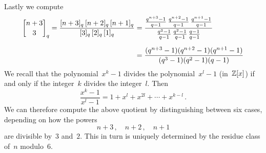 \documentclass[a4paper, 11pt, twoside=semi]{scrartcl}
\begin{document}
Lastly we compute
\begin{align*}
  \qbinom{n+3}{3}_q
  =
  \frac{ \qnum{n+3}_q \, \qnum{n+2}_q \, \qnum{n+1}_q }{ \qnum{3}_q \, \qnum{2}_q \, \qnum{1}_q }
  &=
  \frac{
    \frac{q^{n+3} - 1}{q - 1} \, \frac{q^{n+2} - 1}{q - 1} \, \frac{q^{n+1} - 1}{q - 1}
  }{
    \frac{q^3 - 1}{q - 1} \, \frac{q^2 - 1}{q - 1} \, \frac{q - 1}{q - 1}
  }
  \\[0.6em]
  &=
  \frac{ (q^{n+3} - 1) (q^{n+2} - 1) (q^{n+1} - 1) }{ (q^3 - 1) (q^2 - 1) (q - 1) }
\end{align*}
We recall that the polynomial~$x^k - 1$ divides the polynomial~$x^l - 1$ (in~$\mathbb{Z}[x]$) if and only if the integer~$k$ divides the integer~$l$.
Then
\[
  \frac{x^k - 1}{x^l - 1}
  =
  1 + x^l + x^{2l} + \dotsb + x^{k-l} \,.
\]
We can therefore compute the above quotient by distinguishing between six cases, depending on how the powers
\[
  n + 3 \,,
  \quad
  n + 2 \,,
  \quad
  n + 1
\]
are divisible by~$3$ and~$2$.
This in turn is uniquely determined by the residue class of~$n$ modulo~$6$.
\end{document}
